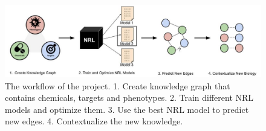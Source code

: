 \begin{figure}[!ht]
    \centering
    \includegraphics[scale=0.39]
    {figures/workflow.jpg}
    \caption [The workflow of the project]{\label{fig:workflow} The workflow of the project. 1. Create knowledge graph that contains chemicals, targets and phenotypes. 2. Train different NRL models and optimize them. 3. Use the best NRL model to predict new edges. 4. Contextualize the new knowledge.}
\end{figure}
